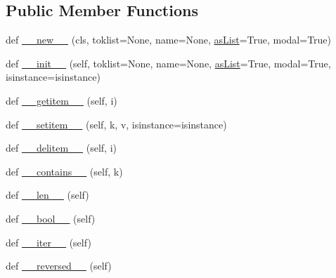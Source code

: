 \subsection*{Public Member Functions}
\begin{DoxyCompactItemize}
\item 
def \hyperlink{classsetuptools_1_1__vendor_1_1pyparsing_1_1ParseResults_a985e66ffeff9506a81ed9b13fee5f686}{\+\_\+\+\_\+new\+\_\+\+\_\+} (cls, toklist=None, name=None, \hyperlink{classsetuptools_1_1__vendor_1_1pyparsing_1_1ParseResults_a8d1cc9ef72b2fcf972c240eae0e59e87}{as\+List}=True, modal=True)
\item 
def \hyperlink{classsetuptools_1_1__vendor_1_1pyparsing_1_1ParseResults_a7d7a395036e3c5e696230f1229bef36e}{\+\_\+\+\_\+init\+\_\+\+\_\+} (self, toklist=None, name=None, \hyperlink{classsetuptools_1_1__vendor_1_1pyparsing_1_1ParseResults_a8d1cc9ef72b2fcf972c240eae0e59e87}{as\+List}=True, modal=True, isinstance=isinstance)
\item 
def \hyperlink{classsetuptools_1_1__vendor_1_1pyparsing_1_1ParseResults_ac67f6359e154955879ca3354b76c124a}{\+\_\+\+\_\+getitem\+\_\+\+\_\+} (self, i)
\item 
def \hyperlink{classsetuptools_1_1__vendor_1_1pyparsing_1_1ParseResults_ae10b62f50b58cd72e321341128fc2ea0}{\+\_\+\+\_\+setitem\+\_\+\+\_\+} (self, k, v, isinstance=isinstance)
\item 
def \hyperlink{classsetuptools_1_1__vendor_1_1pyparsing_1_1ParseResults_a31b99f9722ffb3b93d28b62449cb3bb2}{\+\_\+\+\_\+delitem\+\_\+\+\_\+} (self, i)
\item 
def \hyperlink{classsetuptools_1_1__vendor_1_1pyparsing_1_1ParseResults_ae44e2748c0ab945240372773ea0221c9}{\+\_\+\+\_\+contains\+\_\+\+\_\+} (self, k)
\item 
def \hyperlink{classsetuptools_1_1__vendor_1_1pyparsing_1_1ParseResults_aa5770b554140895fe54c5d39d4a9b338}{\+\_\+\+\_\+len\+\_\+\+\_\+} (self)
\item 
def \hyperlink{classsetuptools_1_1__vendor_1_1pyparsing_1_1ParseResults_a13ac42ca924b5b4a61b96a803930f4ce}{\+\_\+\+\_\+bool\+\_\+\+\_\+} (self)
\item 
def \hyperlink{classsetuptools_1_1__vendor_1_1pyparsing_1_1ParseResults_af79c2839bac60beb45e8e000433a68d6}{\+\_\+\+\_\+iter\+\_\+\+\_\+} (self)
\item 
def \hyperlink{classsetuptools_1_1__vendor_1_1pyparsing_1_1ParseResults_a75b12ca1c2b68120ff7f5d8b58e3e090}{\+\_\+\+\_\+reversed\+\_\+\+\_\+} (self)
\item 

\end{DoxyCompactItemize}
